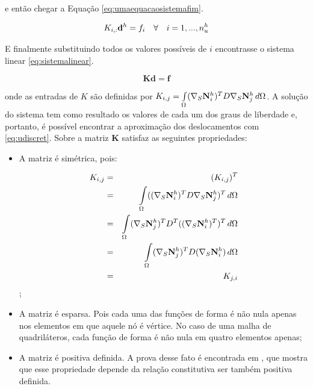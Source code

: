 e então chegar a Equação \eqref{eq:umaequacaosistemafim}.

\begin{equation} \label{eq:umaequacaosistemafim}
K_{i,:} \mathbf{d}^h = f_i \quad \forall \quad i=1,..., \qtdfreedomfine
\end{equation}

E finalmente substituindo todos os valores possíveis de $i$ encontrasse o sistema linear \eqref{eq:sistemalinear}.

\begin{equation}\label{eq:sistemalinear}
    \mathbf{K} \mathbf{d} = \mathbf{f}
\end{equation}



onde as entradas de $K$ são definidas por  $K_{i,j} = \omeint{\kij{i}{j}}$. A solução do sistema tem como resultado os valores de cada um dos graus de liberdade e, portanto, é possível encontrar a aproximação dos deslocamentos com \eqref{eq:udiscret}. Sobre a matriz $\mathbf{K}$ satisfaz as seguintes propriedades:


\begin{itemize}
    \item A matriz é simétrica, pois:

    \begin{eqnarray}
    K_{i,j} & = & (K_{i,j})^T \\
            & = & \omeint{((\sopnabla \basefunctionfine)^T D \sopnabla \basefunctionfine[j])^T} \\
            & = & \omeint{ ( \sopnabla \basefunctionfine[j])^T D^T  ((\sopnabla \basefunctionfine)^T)^T}\\
            & = & \omeint{ ( \sopnabla \basefunctionfine[j])^T D  (\sopnabla \basefunctionfine)} \\
            & = & K_{j,i}
    \end{eqnarray};


    \item A matriz é esparsa. Pois cada uma das funções de forma é não nula apenas nos elementos em que aquele nó é vértice. No caso de uma malha de quadriláteros, cada função de forma é não nula em quatro elementos apenas;

    \item A matriz é positiva definida. A prova desse fato é encontrada em \cite{hughes}, que mostra que esse propriedade depende da relação constitutiva ser também positiva definida.
\end{itemize}


